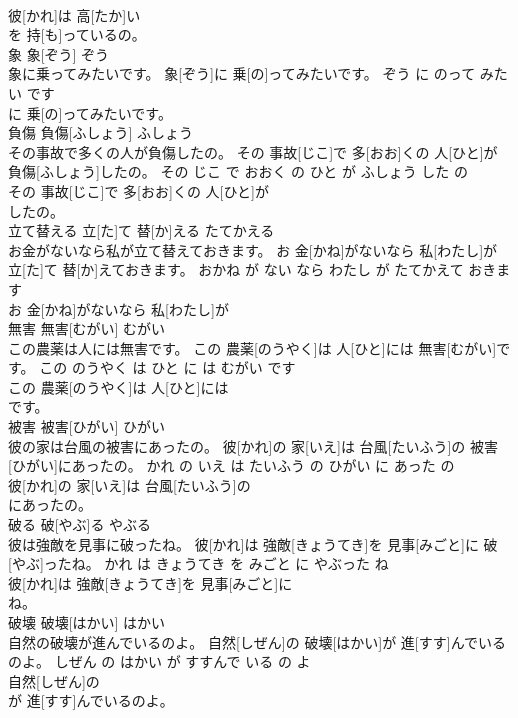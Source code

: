 \documentclass[8pt]{extreport}
\begin{document}
\begin{CJK}{UTF8}{min}
\\	彼[かれ]は 高[たか]い
\\	を 持[も]っているの。			
\\	象	象[ぞう]	ぞう	
\\	象に乗ってみたいです。	象[ぞう]に 乗[の]ってみたいです。	ぞう に のって みたい です	
\\	に 乗[の]ってみたいです。			
\\	負傷	負傷[ふしょう]	ふしょう	
\\	その事故で多くの人が負傷したの。	その 事故[じこ]で 多[おお]くの 人[ひと]が 負傷[ふしょう]したの。	その じこ で おおく の ひと が ふしょう した の	
\\	その 事故[じこ]で 多[おお]くの 人[ひと]が
\\	したの。			
\\	立て替える	立[た]て 替[か]える	たてかえる	
\\	お金がないなら私が立て替えておきます。	お 金[かね]がないなら 私[わたし]が 立[た]て 替[か]えておきます。	おかね が ない なら わたし が たてかえて おきます	
\\	お 金[かね]がないなら 私[わたし]が
\\	無害	無害[むがい]	むがい	
\\	この農薬は人には無害です。	この 農薬[のうやく]は 人[ひと]には 無害[むがい]です。	この のうやく は ひと に は むがい です	
\\	この 農薬[のうやく]は 人[ひと]には
\\	です。			
\\	被害	被害[ひがい]	ひがい	
\\	彼の家は台風の被害にあったの。	彼[かれ]の 家[いえ]は 台風[たいふう]の 被害[ひがい]にあったの。	かれ の いえ は たいふう の ひがい に あった の	
\\	彼[かれ]の 家[いえ]は 台風[たいふう]の
\\	にあったの。			
\\	破る	破[やぶ]る	やぶる	
\\	彼は強敵を見事に破ったね。	彼[かれ]は 強敵[きょうてき]を 見事[みごと]に 破[やぶ]ったね。	かれ は きょうてき を みごと に やぶった ね	
\\	彼[かれ]は 強敵[きょうてき]を 見事[みごと]に
\\	ね。			
\\	破壊	破壊[はかい]	はかい	
\\	自然の破壊が進んでいるのよ。	自然[しぜん]の 破壊[はかい]が 進[すす]んでいるのよ。	しぜん の はかい が すすんで いる の よ	
\\	自然[しぜん]の
\\	が 進[すす]んでいるのよ。			

\end{CJK}
\end{document}
